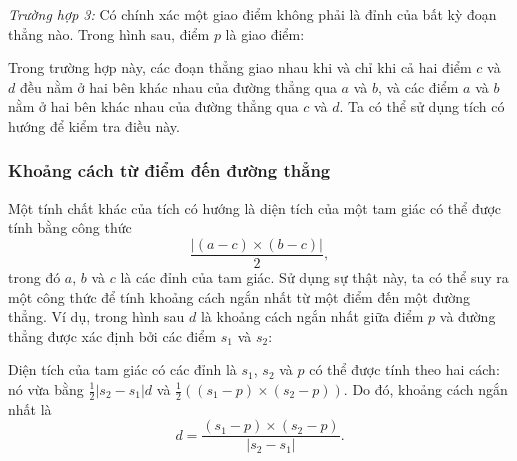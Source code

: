 \textit{Trường hợp 3:}
Có chính xác một giao điểm
không phải là đỉnh của bất kỳ đoạn thẳng nào.
Trong hình sau, điểm $p$
là giao điểm:
\begin{center}
\end{center}

Trong trường hợp này, các đoạn thẳng giao nhau
khi và chỉ khi cả hai điểm $c$ và $d$ đều
nằm ở hai bên khác nhau của đường thẳng qua $a$ và $b$,
và các điểm $a$ và $b$ nằm ở hai bên khác nhau
của đường thẳng qua $c$ và $d$.
Ta có thể sử dụng tích có hướng để kiểm tra điều này.

\subsubsection{Khoảng cách từ điểm đến đường thẳng}

Một tính chất khác của tích có hướng là
diện tích của một tam giác có thể được tính
bằng công thức
\[\frac{| (a-c) \times (b-c) |}{2},\]
trong đó $a$, $b$ và $c$ là các đỉnh của tam giác.
Sử dụng sự thật này, ta có thể suy ra một công thức
để tính khoảng cách ngắn nhất từ một điểm đến một đường thẳng.
Ví dụ, trong hình sau $d$ là
khoảng cách ngắn nhất giữa điểm $p$ và đường thẳng
được xác định bởi các điểm $s_1$ và $s_2$:
\begin{center}
\end{center}

Diện tích của tam giác có các đỉnh là
$s_1$, $s_2$ và $p$ có thể được tính theo hai cách:
nó vừa bằng
$\frac{1}{2} |s_2-s_1| d$ và
$\frac{1}{2} ((s_1-p) \times (s_2-p))$.
Do đó, khoảng cách ngắn nhất là
\[ d = \frac{(s_1-p) \times (s_2-p)}{|s_2-s_1|} .\]

